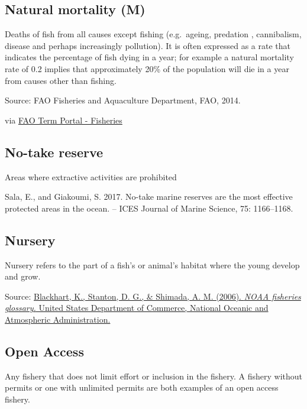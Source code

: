 \documentclass[
  11pt,
]{book}
\begin{document}
\hypertarget{natural-mortality-m}{%
\subsection{Natural mortality (M)}\label{natural-mortality-m}}

Deaths of fish from all causes except fishing (e.g.~ageing, predation , cannibalism, disease and perhaps increasingly pollution). It is often expressed as a rate that indicates the percentage of fish dying in a year; for example a natural mortality rate of 0.2 implies that approximately 20\% of the population will die in a year from causes other than fishing.

Source: FAO Fisheries and Aquaculture Department, FAO, 2014.

via \href{http://www.fao.org/fishery/glossary/en}{FAO Term Portal - Fisheries}

\hypertarget{no-take-reserve}{%
\subsection{No-take reserve}\label{no-take-reserve}}

Areas where extractive activities are prohibited

Sala, E., and Giakoumi, S. 2017. No-take marine reserves are the most effective protected areas in the ocean. -- ICES Journal of Marine Science, 75: 1166--1168.

\hypertarget{nursery}{%
\subsection{Nursery}\label{nursery}}

Nursery refers to the part of a fish's or animal's habitat where the young develop and grow.

Source: \href{https://repository.library.noaa.gov/view/noaa/12856}{Blackhart, K., Stanton, D. G., \& Shimada, A. M. (2006). \emph{NOAA fisheries glossary.} United States Department of Commerce, National Oceanic and Atmospheric Administration.}

\hypertarget{open-access}{%
\subsection{Open Access}\label{open-access}}

Any fishery that does not limit effort or inclusion in the fishery. A fishery without permits or one with unlimited permits are both examples of an open access fishery.
\end{document}
